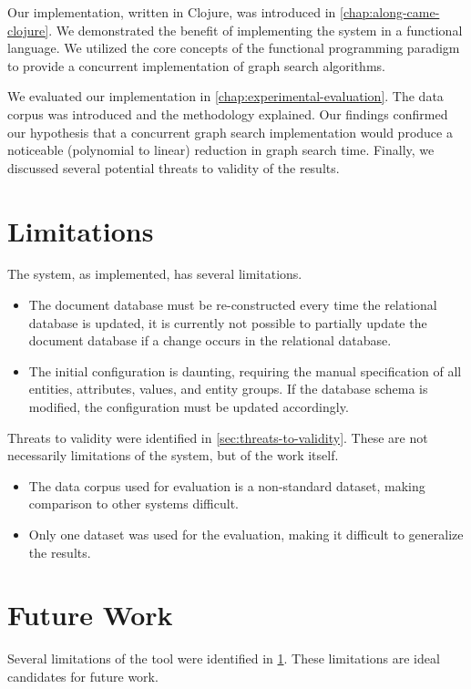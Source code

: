 		Our implementation, written in Clojure, was introduced in \cref{chap:along-came-clojure}.  We demonstrated the benefit of implementing the system in a functional language.  We utilized the core concepts of the functional programming paradigm to provide a concurrent implementation of graph search algorithms.
		
		We evaluated our implementation in \cref{chap:experimental-evaluation}.  The data corpus was introduced and the methodology explained.  Our findings confirmed our hypothesis that a concurrent graph search implementation would produce a noticeable (polynomial to linear) reduction in graph search time.  Finally, we discussed several potential threats to validity of the results.
	
	\section{Limitations}
	\label{sec:limitations}
		The system, as implemented, has several limitations.
		
		\begin{itemize}
			\item The document database must be re-constructed every time the relational database is updated, it is currently not possible to partially update the document database if a change occurs in the relational database.
			\item The initial configuration is daunting, requiring the manual specification of all entities, attributes, values, and entity groups.  If the database schema is modified, the configuration must be updated accordingly.
		\end{itemize}
		
		Threats to validity were identified in \cref{sec:threats-to-validity}.  These are not necessarily limitations of the system, but of the work itself.
		
		\begin{itemize}
			\item The data corpus used for evaluation is a non-standard dataset, making comparison to other systems difficult.
			\item Only one dataset was used for the evaluation, making it difficult to generalize the results.
		\end{itemize}
	
	\section{Future Work}
		Several limitations of the tool were identified in \cref{sec:limitations}.  These limitations are ideal candidates for future work.
		
